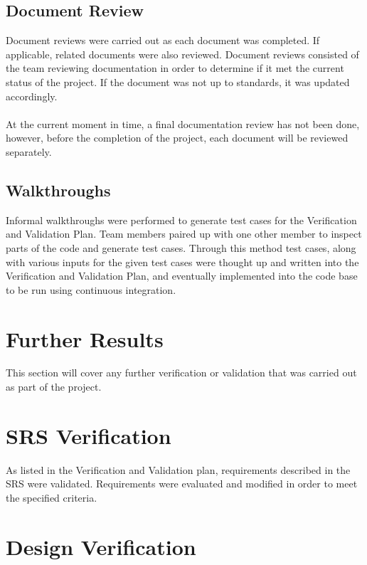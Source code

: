\documentclass[12pt, titlepage]{article}
\begin{document}
\subsection{Document Review}

Document reviews were carried out as each document was completed. If applicable, related documents were also reviewed. Document reviews consisted of the team reviewing documentation in order to determine if it met the current status of the project. If the document was not up to standards, it was updated accordingly.
\\\\
\noindent
At the current moment in time, a final documentation review has not been done, however, before the completion of the project, each document will be reviewed separately.

\subsection{Walkthroughs}

Informal walkthroughs were performed to generate test cases for the Verification and Validation Plan. Team members paired up with one other member to inspect parts of the code and generate test cases. Through this method test cases, along with various inputs for the given test cases were thought up and written into the Verification and Validation Plan, and eventually implemented into the code base to be run using continuous integration.

\section{Further Results}

This section will cover any further verification or validation that was carried out as part of the project.

\section{SRS Verification}

As listed in the Verification and Validation plan, requirements described in the SRS were validated. Requirements were evaluated and modified in order to meet the specified criteria.

\section{Design Verification}
\end{document}

